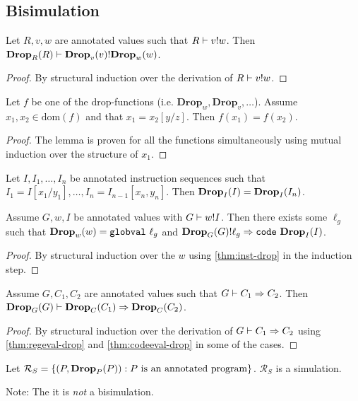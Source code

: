 \subsection{Bisimulation}

\begin{lemma}
  \label{thm:regeval-drop}
  Let $R, v, w$ are annotated values such that ${R} |- {v} ! {w}$. Then
  ${\mathbf{Drop}_{{R}}({R})} |- {\mathbf{Drop}_{{v}}({v})} ! {\mathbf{Drop}_{{w}}({w})}$.
\end{lemma}
\begin{proof}
  By structural induction over the derivation of ${R} |- {v} ! {w}$.
\end{proof}

\begin{lemma}
  Let $f$ be one of the drop-functions (i.e.
  $\mathbf{Drop}_w, \mathbf{Drop}_v, \dots$). Assume
  $x_1, x_2 \in \mathrm{dom}(f)$ and that $x_1 = x_2[y / z]$. Then
  $f(x_1) = f(x_2)$.
\end{lemma}
\begin{proof}
  The lemma is proven for all the functions simultaneously using mutual
  induction over the structure of $x_1$.
\end{proof}

\begin{corollary}
  \label{thm:inst-drop}
  Let $I, I_1, \dots, I_n$ be annotated instruction sequences such that
  $I_1 = I[x_1 / y_1], \dots, I_n = I_{n-1}[x_n, y_n]$. Then
  $\mathbf{Drop}_{{I}}({I}) = \mathbf{Drop}_{{I}}({I_n})$.
\end{corollary}

\begin{lemma}
  \label{thm:codeeval-drop}
  Assume $G, w, I$ be annotated values with ${G} |- {w} ! {I}$. Then there
  exists some $\ell_g$ such that $\drop{w}{w} = \mathtt{globval}\ \ell_g$ and
  $\lookup{\drop{G}{G}}{\ell_g}{\mathtt{code}\ \drop{I}{I}}$.
\end{lemma}
\begin{proof}
  By structural induction over the $w$ using \autoref{thm:inst-drop} in the
  induction step.
\end{proof}

\begin{lemma}
  \label{thm:exec-drop}
  Assume $G, C_1, C_2$ are annotated values such that
  ${G} |- {C_1} => {C_2}$. Then
  ${\mathbf{Drop}_{{G}}({G})} |- {\mathbf{Drop}_{{C}}({C_1})} => {\mathbf{Drop}_{{C}}({C_2})}$.
\end{lemma}
\begin{proof}
  By structural induction over the derivation of ${G} |- {C_1} => {C_2}$
  using \autoref{thm:regeval-drop} and \autoref{thm:codeeval-drop} in some of
  the cases.
\end{proof}

\begin{corollary}[Simulation]
  \label{thm:simulation}
  Let $\mathcal{R}_S =
  \{(P, \mathbf{Drop}_{{P}}({P})) : P\text{ is an annotated program}\}$.
  $\mathcal{R}_S$ is a simulation.
\end{corollary}

Note: The it is \emph{not} a bisimulation.
